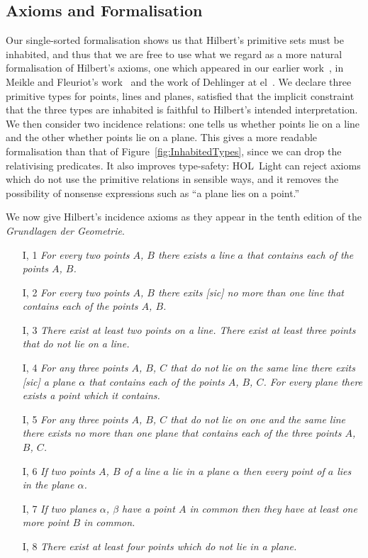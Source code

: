 \subsection{Axioms and Formalisation}
Our single-sorted formalisation shows us that Hilbert's primitive sets must be inhabited, and thus that we are free to use what we regard as a more natural formalisation of Hilbert's axioms, one which appeared in our earlier work~\cite{ScottMScThesis}, in Meikle and Fleuriot's work~\cite{MeikleFleuriotFormalizingHilbert} and the work of Dehlinger at el~\cite{DehlingerFOG}. We declare three primitive types for points, lines and planes, satisfied that the implicit constraint that the three types are inhabited is faithful to Hilbert's intended interpretation. We then consider two incidence relations: one tells us whether points lie on a line and the other whether points lie on a plane. This gives a more readable formalisation than that of Figure~\ref{fig:InhabitedTypes}, since we can drop the relativising predicates. It also improves type-safety: HOL~Light can reject axioms which do not use the primitive relations in sensible ways, and it removes the possibility of nonsense expressions such as ``a plane lies on a point.''

We now give Hilbert's incidence axioms as they appear in the tenth edition of the \emph{Grundlagen der Geometrie}.
\begin{enumerate}
\item[I, 1] \emph{For every two points $A$, $B$ there exists a line $a$ that contains each of the points $A$, $B$.}
\item[I, 2] \emph{For every two points $A$, $B$ there exits [sic] no more than one line that contains each of the points $A$, $B$.}
\item[I, 3] \emph{There exist at least two points on a line. There exist at least three points that do not lie on a line.}
\item[I, 4] \emph{For any three points $A$, $B$, $C$ that do not lie on the same line there exits [sic] a plane $\alpha$ that contains each of the points $A$, $B$, $C$. For every plane there exists a point which it contains.}
\item[I, 5] \emph{For any three points $A$, $B$, $C$ that do not lie on one and the same line there exists no more than one plane that contains each of the three points $A$, $B$, $C$.}
\item[I, 6] \emph{If two points $A$, $B$ of a line $a$ lie in a plane $\alpha$ then every point of $a$ lies in the plane $\alpha$.}
\item[I, 7] \emph{If two planes $\alpha$, $\beta$ have a point $A$ in common then they have at least one more point $B$ in common.}
\item[I, 8] \emph{There exist at least four points which do not lie in a plane.}
\end{enumerate}

